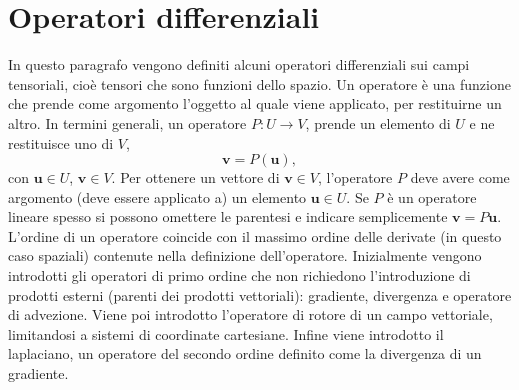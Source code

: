 \section{Operatori differenziali}\label{ch:operatoriDiff}
In questo paragrafo vengono definiti alcuni operatori differenziali sui campi tensoriali, cioè tensori che sono funzioni dello spazio. Un operatore è una funzione che prende come argomento l'oggetto al quale viene applicato, per restituirne un altro. In termini generali, un operatore $P: U \rightarrow V$, prende un elemento di $U$ e ne restituisce uno di $V$,
\begin{equation}\label{def:operatore}
  \bm{v} = P(\bm{u}),
\end{equation}
con $\bm{u} \in U$, $\bm{v} \in V$. Per ottenere un vettore di $\bm{v} \in V$, l'operatore $P$ deve avere come argomento (deve essere applicato a) un elemento $\bm{u} \in U$. Se $P$ è un operatore lineare spesso si possono omettere le parentesi e indicare semplicemente $\bm{v}=P\bm{u}$.
L'ordine di un operatore coincide con il massimo ordine delle derivate (in questo caso spaziali) contenute nella definizione dell'operatore. Inizialmente vengono introdotti gli operatori di primo ordine che non richiedono l'introduzione di prodotti esterni (parenti dei prodotti vettoriali): gradiente, divergenza e operatore di advezione. Viene poi introdotto l'operatore di rotore di un campo vettoriale, limitandosi a sistemi di coordinate cartesiane. Infine viene introdotto il laplaciano, un operatore del secondo ordine definito come la divergenza di un gradiente.
